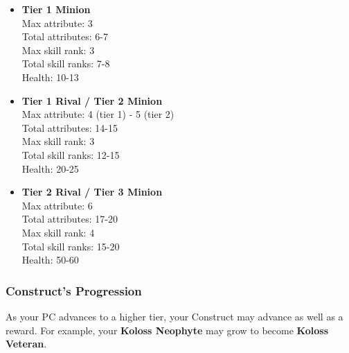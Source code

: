 \begin{itemize}
	\item \textbf{Tier 1 Minion} \\ Max attribute: 3 \\ Total attributes: 6-7 \\ Max skill rank: 3 \\ Total skill ranks: 7-8 \\ Health: 10-13
	
	\item \textbf{Tier 1 Rival / Tier 2 Minion} \\ Max attribute: 4 (tier 1) - 5 (tier 2) \\ Total attributes: 14-15 \\ Max skill rank: 3 \\ Total skill ranks: 12-15 \\ Health: 20-25
	
	\item \textbf{Tier 2 Rival / Tier 3 Minion} \\ Max attribute: 6 \\ Total attributes: 17-20 \\ Max skill rank: 4 \\ Total skill ranks: 15-20 \\ Health: 50-60 
\end{itemize}


\subsubsection{Construct's Progression}

As your PC advances to a higher tier, your Construct may advance as well as a reward. For example, your \textbf{Koloss Neophyte} may grow to become \textbf{Koloss Veteran}.

